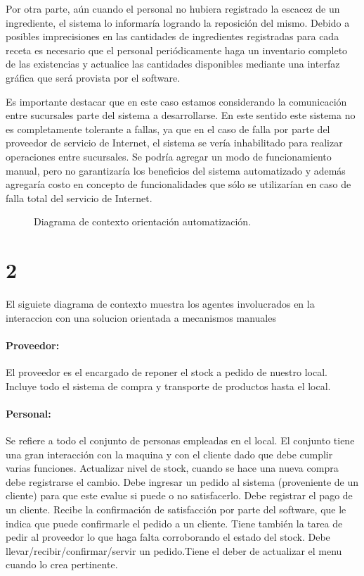 \documentclass[a4paper,10pt]{article}
\begin{document}
Por otra parte, aún cuando el personal no hubiera registrado la escacez de un ingrediente, el sistema lo informaría logrando la reposición del mismo. Debido a posibles imprecisiones en las cantidades de ingredientes registradas para cada receta es necesario que el personal periódicamente haga un inventario completo de las existencias y actualice las cantidades disponibles mediante una interfaz gráfica que será provista por el software.

Es importante destacar que en este caso estamos considerando la comunicación entre sucursales parte del sistema a desarrollarse. En este sentido este sistema no es completamente tolerante a fallas, ya que en el caso de falla por parte del proveedor de servicio de Internet, el sistema se vería inhabilitado para realizar operaciones entre sucursales. Se podría agregar un modo de funcionamiento manual, pero no garantizaría los beneficios del sistema automatizado y además agregaría costo en concepto de funcionalidades que sólo se utilizarían en caso de falla total del servicio de Internet. 
\begin{figure}[H]
\centering
{}
\caption{Diagrama de contexto orientación automatización.}
\end{figure}

\section*{2}
El siguiete diagrama de contexto muestra los agentes involucrados en la interaccion con una solucion orientada a mecanismos manuales


\paragraph{Proveedor:}
El proveedor es el encargado de reponer el stock a pedido de nuestro local. Incluye todo el sistema de compra y transporte de productos hasta el local.
\\
\paragraph{Personal:}
Se refiere a todo el conjunto de personas empleadas en el local. El conjunto tiene una gran interacción con la maquina y con el cliente dado que debe cumplir varias funciones. Actualizar nivel de stock, cuando se hace una nueva compra debe registrarse el cambio. Debe ingresar un pedido al sistema (proveniente de un cliente) para que este evalue si puede o no satisfacerlo. Debe registrar el pago de un cliente. Recibe la confirmación de satisfacción por parte del software, que le indica que puede confirmarle el pedido a un cliente. Tiene también la tarea de pedir al proveedor lo que haga falta corroborando el estado del stock. Debe llevar/recibir/confirmar/servir un pedido.Tiene el deber de actualizar el menu cuando lo crea pertinente.
\\
\end{document}
